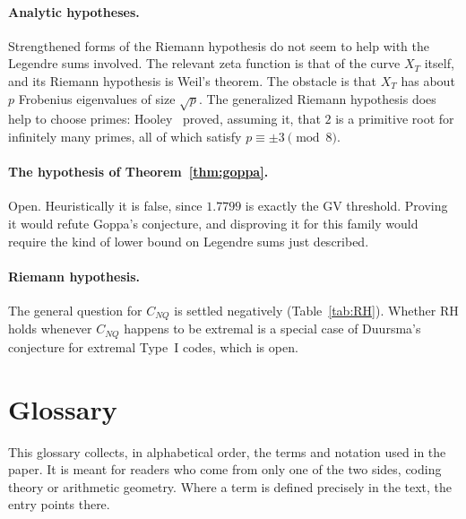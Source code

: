 \documentclass[12pt,letterpaper]{article}
\theoremstyle{definition}
\theoremstyle{remark}
\numberwithin{equation}{section}
\newcommand{\CNQ}{C_{NQ}}
\begin{document}
\paragraph{Analytic hypotheses.} Strengthened forms of the Riemann hypothesis do not
seem to help with the Legendre sums involved. The relevant zeta function is that of
the curve $X_T$ itself, and its Riemann hypothesis is Weil's theorem. The obstacle is
that $X_T$ has about $p$ Frobenius eigenvalues of size $\sqrt p$. The generalized
Riemann hypothesis does help to choose primes: Hooley~\cite{Ho67} proved, assuming
it, that $2$ is a primitive root for infinitely many primes, all of which satisfy
$p\equiv\pm3\pmod8$.

\paragraph{The hypothesis of Theorem~\ref{thm:goppa}.} Open. Heuristically it is
false, since $1.7799$ is exactly the GV threshold. Proving it would refute Goppa's
conjecture, and disproving it for this family would require the kind of
lower bound on Legendre sums just described.

\paragraph{Riemann hypothesis.} The general question for $\CNQ$ is settled
negatively (Table~\ref{tab:RH}). Whether RH holds whenever $\CNQ$ happens to be
extremal is a special case of Duursma's conjecture for extremal Type~I codes, which
is open.

\appendix
\section{Glossary}
\label{app:glossary}

This glossary collects, in alphabetical order, the terms and notation used in the
paper. It is meant for readers who come from only one of the two sides, coding
theory or arithmetic geometry. Where a term is defined precisely in the text, the
entry points there.
\end{document}
